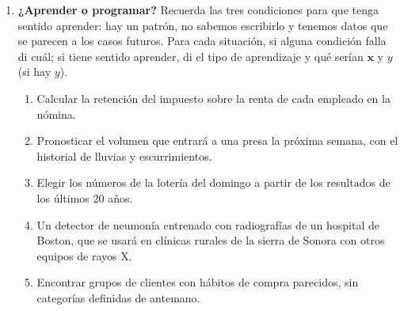 \documentclass[11pt]{article}
\newcommand{\vx}{\mathbf{x}}
\newcommand{\espacio}[1]{\par\vspace{#1}}
\newcommand{\nuevapagina}{\newpage}
\begin{document}
\begin{enumerate}
\nuevapagina
\item \textbf{¿Aprender o programar?} Recuerda las tres condiciones para que tenga sentido aprender: hay un patrón, no sabemos escribirlo y tenemos datos que se parecen a los casos futuros. Para cada situación, si alguna condición falla di cuál; si tiene sentido aprender, di el tipo de aprendizaje y qué serían $\vx$ y $y$ (si hay $y$).
\begin{enumerate}
  \item Calcular la retención del impuesto sobre la renta de cada empleado en la nómina.
  \espacio{2.2cm}
  \item Pronosticar el volumen que entrará a una presa la próxima semana, con el historial de lluvias y escurrimientos.
  \espacio{2.2cm}
  \item Elegir los números de la lotería del domingo a partir de los resultados de los últimos 20 años.
  \espacio{2.2cm}
  \item Un detector de neumonía entrenado con radiografías de un hospital de Boston, que se usará en clínicas rurales de la sierra de Sonora con otros equipos de rayos X.
  \espacio{2.2cm}
  \item Encontrar grupos de clientes con hábitos de compra parecidos, sin categorías definidas de antemano.
  \espacio{2.2cm}
\end{enumerate}

\end{enumerate}
\end{document}
